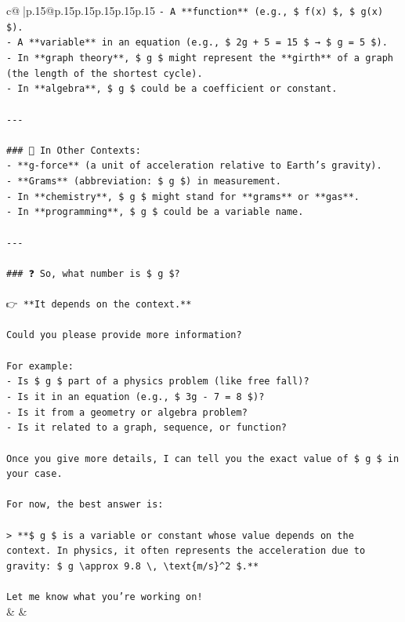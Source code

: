 \documentclass{article}
\begin{document}
{\begin{supertabular}{c@{$\;$}|p{.15\linewidth}@{}p{.15\linewidth}p{.15\linewidth}p{.15\linewidth}p{.15\linewidth}p{.15\linewidth}}
{{{\texttt{{-} A **function** (e.g., \$ f(x) \$, \$ g(x) \$).} \\
\texttt{{-} A **variable** in an equation (e.g., \$ 2g + 5 = 15 \$ → \$ g = 5 \$).} \\
\texttt{{-} In **graph theory**, \$ g \$ might represent the **girth** of a graph (the length of the shortest cycle).} \\
\texttt{{-} In **algebra**, \$ g \$ could be a coefficient or constant.} \\
\\ 
\texttt{{-}{-}{-}} \\
\\ 
\texttt{\#\#\# 🔹 In Other Contexts:} \\
\texttt{{-} **g{-}force** (a unit of acceleration relative to Earth's gravity).} \\
\texttt{{-} **Grams** (abbreviation: \$ g \$) in measurement.} \\
\texttt{{-} In **chemistry**, \$ g \$ might stand for **grams** or **gas**.} \\
\texttt{{-} In **programming**, \$ g \$ could be a variable name.} \\
\\ 
\texttt{{-}{-}{-}} \\
\\ 
\texttt{\#\#\# ❓ So, what number is \$ g \$?} \\
\\ 
\texttt{👉 **It depends on the context.**} \\
\\ 
\texttt{Could you please provide more information?} \\
\\ 
\texttt{For example:} \\
\texttt{{-} Is \$ g \$ part of a physics problem (like free fall)?} \\
\texttt{{-} Is it in an equation (e.g., \$ 3g {-} 7 = 8 \$)?} \\
\texttt{{-} Is it from a geometry or algebra problem?} \\
\texttt{{-} Is it related to a graph, sequence, or function?} \\
\\ 
\texttt{Once you give more details, I can tell you the exact value of \$ g \$ in your case.} \\
\\ 
\texttt{For now, the best answer is:} \\
\\ 
\texttt{> **\$ g \$ is a variable or constant whose value depends on the context. In physics, it often represents the acceleration due to gravity: \$ g \textbackslash{}approx 9.8 \textbackslash{}, \textbackslash{}text\{m/s\}\^{}2 \$.**} \\
\\ 
\texttt{Let me know what you're working on!} \\
            }
        }
    }
    & & \\ \\


\end{supertabular}}
\end{document}
